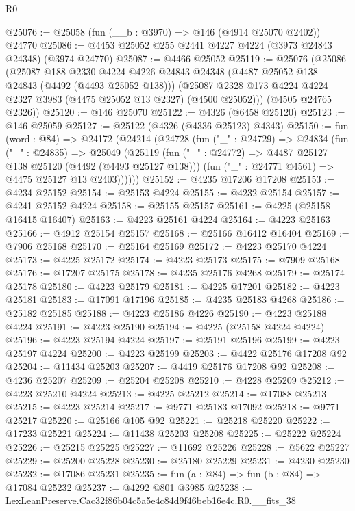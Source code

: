 \begin{lexlean}{R0}
\begin{coremodule}
@25076 := @25058 (fun (__b : @3970) => @146 (@4914 @25070 @2402)) @24770
@25086 := @4453 @25052 @255 @2441 @4227 @4224 (@3973 @24843 @24348) (@3974 @24770)
@25087 := @4466 @25052
@25119 := @25076
    (@25086
      (@25087
        @188
        @2330
        @4224
        @4226
        @24843
        @24348
        (@4487 @25052 @138 @24843 (@4492 (@4493 @25052 @138)))
        (@25087 @2328 @173 @4224 @4224 @2327 @3983 (@4475 @25052 @13 @2327) (@4500 @25052)))
      (@4505 @24765 @2326))
@25120 := @146 @25070
@25122 := @4326 (@6458 @25120)
@25123 := @146 @25059
@25127 := @25122 (@4326 (@4336 @25123) @4343)
@25150 := fun (word : @84) =>
  @24172
    (@24214
      (@24728
        (fun ("_" : @24729) =>
        @24834
          (fun ("_" : @24835) =>
          @25049
            (@25119
              (fun ("_" : @24772) => @4487 @25127 @138 @25120 (@4492 (@4493 @25127 @138)))
              (fun ("_" : @24771 @4561) => @4475 @25127 @13 @2403))))))
@25152 := @4235 @17206 @17208
@25153 := @4234 @25152
@25154 := @25153 @4224
@25155 := @4232 @25154
@25157 := @4241 @25152 @4224
@25158 := @25155 @25157
@25161 := @4225 (@25158 @16415 @16407)
@25163 := @4223 @25161 @4224
@25164 := @4223 @25163
@25166 := @4912 @25154 @25157
@25168 := @25166 @16412 @16404
@25169 := @7906 @25168
@25170 := @25164 @25169
@25172 := @4223 @25170 @4224
@25173 := @4225 @25172
@25174 := @4223 @25173
@25175 := @7909 @25168
@25176 := @17207 @25175
@25178 := @4235 @25176 @4268
@25179 := @25174 @25178
@25180 := @4223 @25179
@25181 := @4225 @17201
@25182 := @4223 @25181
@25183 := @17091 @17196
@25185 := @4235 @25183 @4268
@25186 := @25182 @25185
@25188 := @4223 @25186 @4226
@25190 := @4223 @25188 @4224
@25191 := @4223 @25190
@25194 := @4225 (@25158 @4224 @4224)
@25196 := @4223 @25194 @4224
@25197 := @25191 @25196
@25199 := @4223 @25197 @4224
@25200 := @4223 @25199
@25203 := @4422 @25176 @17208 @92
@25204 := @11434 @25203
@25207 := @4419 @25176 @17208 @92
@25208 := @4236 @25207
@25209 := @25204 @25208
@25210 := @4228 @25209
@25212 := @4223 @25210 @4224
@25213 := @4225 @25212
@25214 := @17088 @25213
@25215 := @4223 @25214
@25217 := @9771 @25183 @17092
@25218 := @9771 @25217
@25220 := @25166 @105 @92
@25221 := @25218 @25220
@25222 := @17233 @25221
@25224 := @11438 @25203 @25208
@25225 := @25222 @25224
@25226 := @25215 @25225
@25227 := @11692 @25226
@25228 := @5622 @25227
@25229 := @25200 @25228
@25230 := @25180 @25229
@25231 := @4230 @25230
@25232 := @17086 @25231
@25235 := fun (a : @84) => fun (b : @84) => @17084 @25232
@25237 := @4292 @801 @3985
@25238 := LexLeanPreserve.Cac32f86b04c5a5e4c84d9f46beb16e4c.R0.__fits_38

\end{coremodule}
\end{lexlean}
